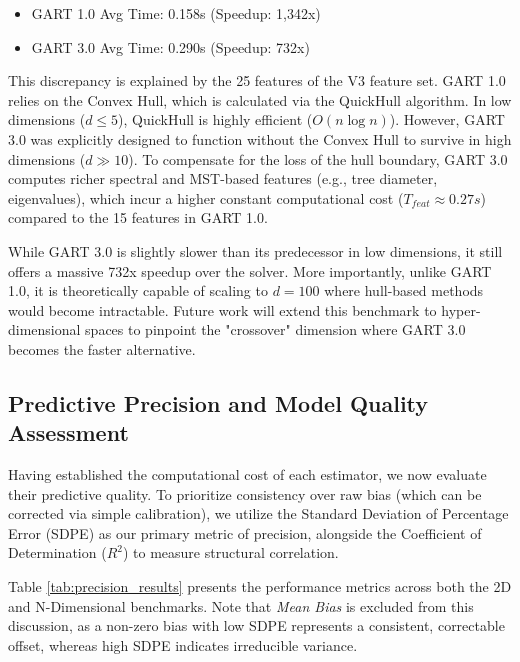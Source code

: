 \documentclass{article}
\begin{document}
\begin{itemize}
    \item GART 1.0 Avg Time: 0.158s (Speedup: 1,342x)
    \item GART 3.0 Avg Time: 0.290s (Speedup: 732x)
\end{itemize}

This discrepancy is explained by the 25 features of the V3 feature set. GART 1.0 relies on the Convex Hull, which is calculated via the QuickHull algorithm. In low dimensions ($d \le 5$), QuickHull is highly efficient ($O(n \log n)$). However, GART 3.0 was explicitly designed to function without the Convex Hull to survive in high dimensions ($d \gg 10$). To compensate for the loss of the hull boundary, GART 3.0 computes richer spectral and MST-based features (e.g., tree diameter, eigenvalues), which incur a higher constant computational cost ($T_{feat} \approx 0.27s$) compared to the 15 features in GART 1.0.

While GART 3.0 is slightly slower than its predecessor in low dimensions, it still offers a massive 732x speedup over the solver. More importantly, unlike GART 1.0, it is theoretically capable of scaling to $d=100$ where hull-based methods would become intractable. Future work will extend this benchmark to hyper-dimensional spaces to pinpoint the "crossover" dimension where GART 3.0 becomes the faster alternative.

\subsection{Predictive Precision and Model Quality Assessment}
\label{subsec:precision_analysis}

Having established the computational cost of each estimator, we now evaluate their predictive quality. To prioritize consistency over raw bias (which can be corrected via simple calibration), we utilize the Standard Deviation of Percentage Error (SDPE) as our primary metric of precision, alongside the Coefficient of Determination ($R^2$) to measure structural correlation.

Table \ref{tab:precision_results} presents the performance metrics across both the 2D and N-Dimensional benchmarks. Note that \textit{Mean Bias} is excluded from this discussion, as a non-zero bias with low SDPE represents a consistent, correctable offset, whereas high SDPE indicates irreducible variance.
\end{document}

